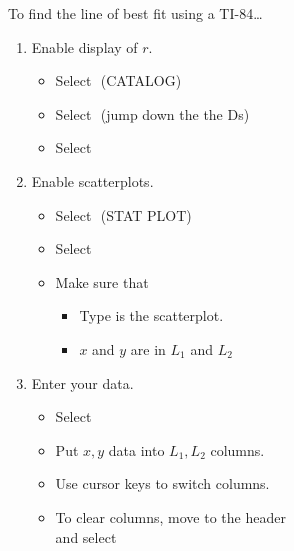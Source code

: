%
\begin{minipage}[t]{0.5\textwidth}
\begin{myConcept}{To find the line of best fit using a {\scshape TI-84}\dots}
    \begin{enumerate}
        \item Enable display of $r$.
            \begin{itemize}
                \item Select 
                    \,\,{\footnotesize\ttfamily (CATALOG)}
                \item Select 
                    \,\,{\footnotesize (jump down the the Ds)}
                \item Select 
            \end{itemize}
        \item Enable scatterplots.
            \begin{itemize}
                \item Select 
                    \,\,{\footnotesize\ttfamily (STAT PLOT)}
                \item Select 
                \item Make sure that 
                    \begin{itemize} 
                        \item {\ttfamily Type} is the scatterplot.
                        \item $x$ and $y$ are in $L_1$ and $L_2$ 
                    \end{itemize}
            \end{itemize}
        \item Enter your data.
            \begin{itemize}
                \item Select 
                \item Put $x, y$ data into $L_1, L_2$ columns.
                \item Use cursor keys to switch columns.
                \item To clear columns, move to the header\\ and select 

\end{itemize}
\end{enumerate}
\end{myConcept}
\end{minipage}
